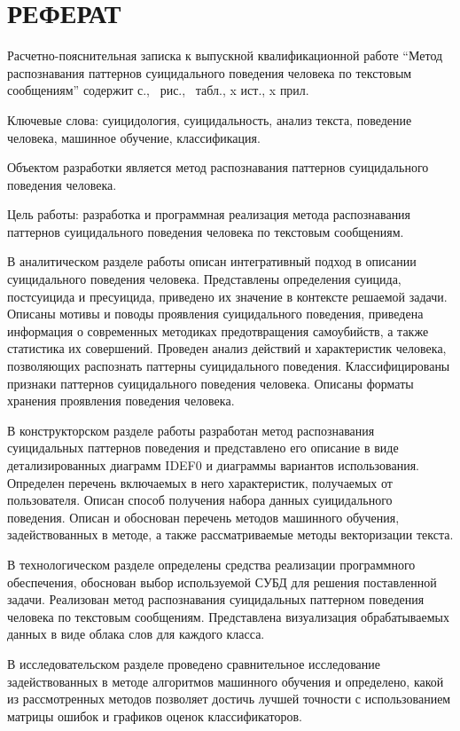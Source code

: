 \section*{РЕФЕРАТ}

Расчетно-пояснительная записка к выпускной квалификационной работе ``Метод распознавания паттернов суицидального поведения человека по текстовым сообщениям'' содержит \pageref{LastPage} с., \totalfigures\ рис., \totaltables\ табл., x ист., x прил.

Ключевые слова: суицидология, суицидальность, анализ текста, поведение человека, машинное обучение, классификация.

Объектом разработки является метод распознавания паттернов суицидального поведения человека.

Цель работы: разработка и программная реализация метода распознавания паттернов суицидального поведения человека по текстовым сообщениям.

В аналитическом разделе работы описан интегративный подход в описании суицидального поведения человека. Представлены определения суицида, постсуицида и пресуицида, приведено их значение в контексте решаемой задачи. Описаны мотивы и поводы проявления суицидального поведения, приведена информация о современных методиках предотвращения самоубийств, а также статистика их совершений. Проведен анализ действий и характеристик человека, позволяющих распознать паттерны суицидального поведения. Классифицированы признаки паттернов суицидального поведения человека. Описаны форматы хранения проявления поведения человека.

В конструкторском разделе работы разработан метод распознавания суицидальных паттернов поведения и представлено его описание в виде детализированных диаграмм IDEF0 и диаграммы вариантов использования. Определен перечень включаемых в него характеристик, получаемых от пользователя. Описан способ получения набора данных суицидального поведения. Описан и обоснован перечень методов машинного обучения, задействованных в методе, а также рассматриваемые методы векторизации текста.

В технологическом разделе определены средства реализации программного обеспечения, обоснован выбор используемой СУБД для решения поставленной задачи. Реализован метод распознавания суицидальных паттерном поведения человека по текстовым сообщениям. Представлена визуализация обрабатываемых данных в виде облака слов для каждого класса.

В исследовательском разделе проведено сравнительное исследование задействованных в методе алгоритмов машинного обучения и определено, какой из рассмотренных методов позволяет достичь лучшей точности с использованием матрицы ошибок и графиков оценок классификаторов.

\pagebreak